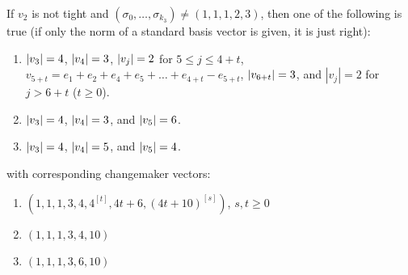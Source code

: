 \begin{prop}\label{prop:k1=1,k2=2,v2justright1}
	If $v_2$ is not tight and $(\sigma_0,\dots,\sigma_{k_3})\not = (1,1,1,2,3)$, then one of the following is true (if only the norm of a standard basis vector is given, it is just right):
	\begin{enumerate}
		\item $\lvert v_3 \rvert = 4$, $\lvert v_4 \rvert = 3$, $\lvert v_j \rvert = 2$ for $5\leq j \leq 4+t$, $v_{5+t} = e_1 + e_2 + e_4 + e_5 + \dots + e_{4+t} - e_{5+t}$, $\lvert v_{6+t} \rvert = 3$, and $|v_j| = 2$ for $j > 6+t$ ($t \ge 0$).
		\item $\lvert v_3 \rvert = 4$, $\lvert v_4 \rvert = 3$, and $\lvert v_5 \rvert = 6$.
		\item $\lvert v_3 \rvert = 4$, $\lvert v_4 \rvert = 5$, and $\lvert v_5 \rvert = 4$.
			\end{enumerate}
	with corresponding changemaker vectors:
	\begin{enumerate}
		\item $(1,1,1,3,4,4^{[t]},4t+6, (4t+10)^{[s]})$, $s,t\ge0$
		\item $(1,1,1,3,4,10)$	
		\item $(1,1,1,3,6,10)$
			\end{enumerate}
\end{prop}
